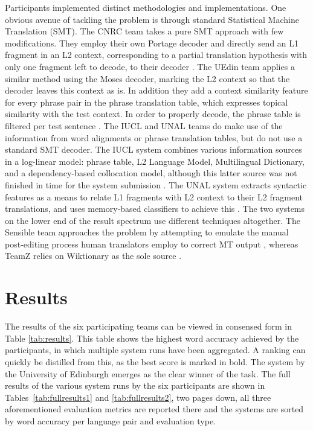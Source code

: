 Participants implemented distinct methodologies and implementations. One
obvious avenue of tackling the problem is through standard Statistical Machine
Translation (SMT). The CNRC team takes a pure SMT approach with few
modifications. They employ their own Portage decoder and directly send an L1
fragment in an L2 context, corresponding to a partial translation hypothesis
with only one fragment left to decode, to their decoder \cite{CNRC}. The UEdin
team applies a similar method using the Moses decoder, marking the L2 context
so that the decoder leaves this context as is. In addition they add a context
similarity feature for every phrase pair in the phrase translation table, which
expresses topical similarity with the test context. In order to properly
decode, the phrase table is filtered per test sentence \cite{UEdin}. The IUCL
and UNAL teams do make use of the information from word alignments or phrase
translation tables, but do not use a standard SMT decoder. The IUCL system
combines various information sources in a log-linear model: phrase table, L2
Language Model, Multilingual Dictionary, and a dependency-based collocation
model, although this latter source was not finished in time for the system
submission \cite{IUCL}. The UNAL system extracts syntactic features as a means
to relate L1 fragments with L2 context to their L2 fragment translations, and
uses memory-based classifiers to achieve this \cite{UNAL}. The two systems on
the lower end of the result spectrum use different techniques altogether. The
Sensible team approaches the problem by attempting to emulate the manual
post-editing process human translators employ to correct MT output
\cite{SENSIBLE},
whereas TeamZ relies on Wiktionary as the sole source \cite{TEAMZ}.


\section{Results}

The results of the six participating teams can be viewed in consensed form in
Table \ref{tab:results}. This table shows the highest word accuracy achieved by
the participants, in which multiple system runs have been aggregated. A ranking
can quickly be distilled from this, as the best score is marked in bold. The
system by the University of Edinburgh emerges as the clear winner of the task.
The full results of the various system runs by the six participants are shown
in Tables~\ref{tab:fullresults1} and \ref{tab:fullresults2}, two pages down,
all three aforementioned evaluation metrics are reported there and the systems
are sorted by word accuracy per language pair and evaluation type.


